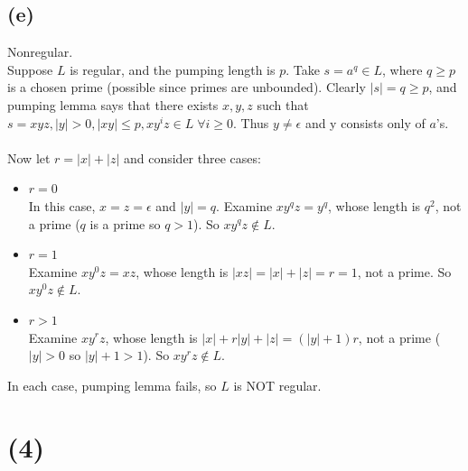 \documentclass{article}
\begin{document}
        \subsection*{(e)}
            Nonregular. \\
            Suppose $L$ is regular, and the pumping length is $p$.
            Take $s = a^q \in L$,
            where $q \geq p$ is a chosen prime (possible since primes are unbounded).
            Clearly $|s| = q \geq p$, and pumping lemma says that
            there exists $x, y, z$ such that
            $s = xyz, |y| > 0, |xy| \leq p, xy^iz \in L \; \forall i \geq 0$.
            Thus $y \neq \epsilon$ and y consists only of $a$'s. \\ \\
            Now let $r = |x| + |z|$ and consider three cases:
            \begin{itemize}
                \item $r = 0$ \\
                In this case, $x = z = \epsilon$ and $|y| = q$.
                Examine $xy^qz = y^q$, whose length is $q^2$,
                not a prime ($q$ is a prime so $q > 1$).
                So $xy^qz \notin L$.
                
                \item $r = 1$ \\
                Examine $xy^0z = xz$, whose length is $|xz| = |x| + |z| = r = 1$,
                not a prime.
                So $xy^0z \notin L$.

                \item $r > 1$ \\
                Examine $xy^rz$,
                whose length is $|x| + r|y| + |z| = (|y| + 1)r$,
                not a prime ($|y| > 0$ so $|y| + 1 > 1$).
                So $xy^rz \notin L$.
            \end{itemize}
            In each case, pumping lemma fails, so $L$ is NOT regular.
    
    \section*{(4)}
\end{document}
